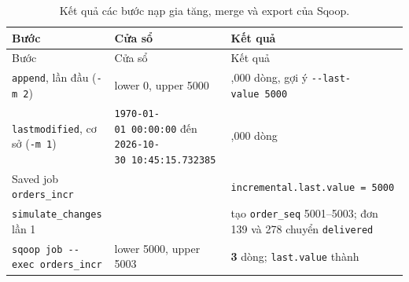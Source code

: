 \documentclass[
  12pt,
  a4paper,
]{article}
\begin{document}
\begin{longtable}[]{@{}
  >{\raggedright\arraybackslash}p{}
  >{\raggedright\arraybackslash}p{}
  >{\raggedright\arraybackslash}p{}@{}}
\caption{\label{tbl:l04-sqoop-incr}Kết quả các bước nạp gia tăng, merge
và export của Sqoop.}\tabularnewline
\toprule\noalign{}
\begin{minipage}[b]{\linewidth}\raggedright
Bước
\end{minipage} & \begin{minipage}[b]{\linewidth}\raggedright
Cửa sổ
\end{minipage} & \begin{minipage}[b]{\linewidth}\raggedright
Kết quả
\end{minipage} \\
\midrule\noalign{}
\endfirsthead
\toprule\noalign{}
\begin{minipage}[b]{\linewidth}\raggedright
Bước
\end{minipage} & \begin{minipage}[b]{\linewidth}\raggedright
Cửa sổ
\end{minipage} & \begin{minipage}[b]{\linewidth}\raggedright
Kết quả
\end{minipage} \\
\midrule\noalign{}
\endhead
\bottomrule\noalign{}
\endlastfoot
\texttt{append}, lần đầu (\texttt{-m\ 2}) & lower 0, upper 5000 & 5,000
dòng, gợi ý \texttt{-\/-last-value\ 5000}\allowbreak{} \\
\texttt{lastmodified}, cơ sở (\texttt{-m\ 1}) &
\texttt{\textquotesingle{}1970-01-01\ 00:}\allowbreak{}\texttt{00:}\allowbreak{}\texttt{00\textquotesingle{}}\allowbreak{}
đến
\texttt{\textquotesingle{}2026-10-30\ 10:}\allowbreak{}\texttt{45:}\allowbreak{}\texttt{15.}\allowbreak{}\texttt{732385\textquotesingle{}}\allowbreak{}
& 5,000 dòng \\
Saved job \texttt{orders\_incr} & &
\texttt{incremental.}\allowbreak{}\texttt{last.}\allowbreak{}\texttt{value\ =}\allowbreak{}\texttt{\ 5000}\allowbreak{} \\
\texttt{simulate\_}\allowbreak{}\texttt{changes}\allowbreak{} lần 1 & &
tạo \texttt{order\_seq} 5001--5003; đơn 139 và 278 chuyển
\texttt{delivered} \\
\texttt{sqoop\ job\ -\/-exec\ orders\_}\allowbreak{}\texttt{incr}\allowbreak{}
& lower 5000, upper 5003 & \textbf{3} dòng; \texttt{last.value} thành

\end{longtable}
\end{document}
